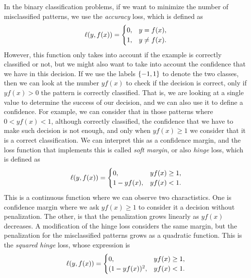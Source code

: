 In the binary classification problems, if we want to minimize the number of misclassified patterns, we use the \emph{accuracy} loss, which is defined as
\begin{equation}
    \nonumber
    \ell(y, f(x)) = 
    \begin{cases}
        0, & y = f(x) ,\\
        1, & y \neq f(x) .
    \end{cases}
\end{equation}
However, this function only takes into account if the example is correctly classified or not, but we might also want to take into account the confidence that we have in this decision. If we use the labels $\left\{-1, 1\right\}$ to denote the two classes, then we can look at the number $y f(x)$ to check if the decision is correct, only if $y f(x) > 0$ the pattern is correctly classified. That is, we are looking at a single value to determine the success of our decision, and we can also use it to define a confidence. For example, we can consider that in those patterns where $0 < y f(x) < 1$, although correctly classified, the confidence that we have to make such decision is not enough, and only when $y f(x) \geq 1$ we consider that it is a correct classification. We can interpret this as a confidence margin, and the loss function that implements this is called \emph{soft margin}, or also \emph{hinge} loss, which is defined as
\begin{equation}
    \label{eq:hinge_def}
    \lossf(y, f(x)) = 
    \begin{cases}
        0, & y f(x) \geq 1 ,\\
        1 - y f(x), & y f(x) < 1 .
    \end{cases}
\end{equation}
This is a continuous function where we can observe two charactistics. One is confidence margin where we ask $y f(x) \geq 1$ to consider it a decision without penalization. The other, is that the penalization grows linearly as $y f(x)$ decreases.
%
A modification of the hinge loss considers the same margin, but the penalization for the misclassified patterns grows as a quadratic function. This is the \emph{squared hinge} loss, whose expression is
\begin{equation}
    \label{eq:sqhinge_def}
    \lossf(y, f(x)) = 
    \begin{cases}
        0, & y f(x) \geq 1 ,\\
        (1 - y f(x))^2, & y f(x) < 1 .
    \end{cases}
\end{equation}
